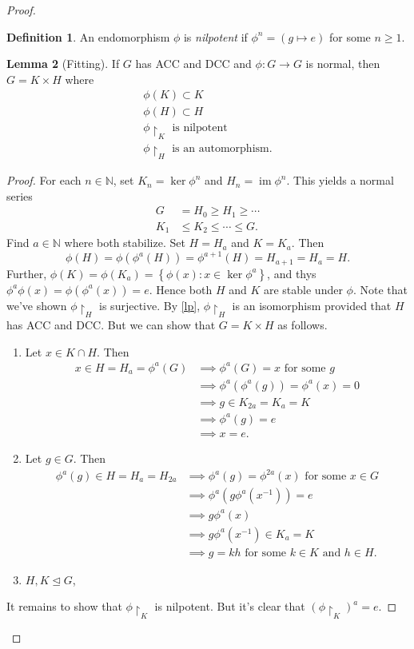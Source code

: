 \documentclass[10pt,letterpaper,cm]{nupset}
\theoremstyle{definition}
\newtheorem{definition}{Definition}[subsection]
\theoremstyle{theorem}
\newtheorem{lemma}[definition]{Lemma}
\theoremstyle{remark}
\newcommand{\N}{\mathbb N}
\newcommand{\1}{\mathbf{1}}
\newcommand{\0}{\vec 0}
\newcommand{\dcc}{\textsf{DCC}\xspace}
\newcommand{\acc}{\textsf{ACC}\xspace}
\DeclareMathOperator{\im}{im}
\begin{document}
\begin{proof}
\begin{definition}
An endomorphism $\phi$ is \textit{nilpotent} if $\phi^n = (g \mapsto e)$ for some $n\geq 1$.
\end{definition}

\begin{lemma}[Fitting]
If $G$ has \acc and \dcc and $\phi: G \to G$ is normal, then $G = K \times H$ where 
\begin{gather*}
\phi(K)  \subset K
\\ \phi(H)   \subset H
\\  \phi \restriction_K  \text{ is nilpotent}
\\  \phi \restriction_H  \text{ is an automorphism}.
\end{gather*}
\end{lemma}
\begin{proof}
For each $n\in \N$, set $K_n = \ker{\phi^n}$ and $H_n = \im \phi^n$. This yields a normal series \begin{align*}
G & = H_0 \geq H_1 \geq \cdots 
\\ K_1 & \leq K_2 \leq \cdots \leq G.
\end{align*}
Find $a \in \N$ where both stabilize. Set $H = H_a$ and $K = K_a$. Then $$\phi(H) = \phi(\phi^a(H)) = \phi^{a+1}(H) = H_{a+1} = H_a = H.$$ Further, $\phi(K) = \phi(K_a) = \left\{\phi(x) : x \in \ker{\phi^a}\right\}$, and thys $\phi^a\phi(x) = \phi(\phi^a(x)) =e$. Hence both $H$ and $K$ are stable under $\phi$. Note that we've shown $\phi \restriction_H$ is surjective. By \cref{lp}, $\phi \restriction_H$ is an isomorphism provided that $H$ has \acc and \dcc. But we can show that $G = K \times H$ as follows.
\begin{enumerate}[label=(\alph*)]
\item Let $x \in K \cap H$. Then 
\begin{align*}
x \in H = H_a = \phi^a(G) & \implies \phi^a(G) = x \text{ for some }g 
\\ &\implies \phi^a(\phi^a(g)) = \phi^a(x) =  0 
\\ & \implies g \in K_{2a} = K_a = K 
\\ & \implies \phi^a(g) = e 
\\ & \implies x =e.
\end{align*}
\item Let $g \in G$. Then 
\begin{align*} \phi^a(g) \in H = H_a = H_{2a} & \implies \phi^a(g) = \phi^{2a}(x) \text{ for some }x\in G
\\ &  \implies \phi^a(g \phi^a(x^{-1})) =e
\\ &  \implies g\phi^a(x) 
\\ & \implies g\phi^a(x^{-1}) \in K_a =K 
\\ & \implies g = kh \text{ for some }k\in K \text{ and }h\in H.
\end{align*}
\item $H, K \unlhd G$,
\end{enumerate}
It remains to show that $\phi \restriction_K$ is nilpotent. But it's clear that $(\phi \restriction_K)^a = e$.
\end{proof}


\end{proof}
\end{document}
